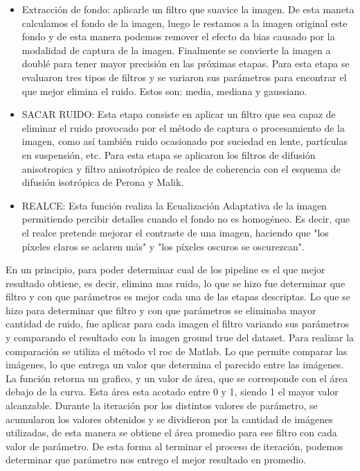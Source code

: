 \begin{itemize}
	\item Extracci\'on de fondo: aplicarle un filtro que suavice la imagen. De esta maneta calculamos el fondo de la imagen, luego le restamos a la imagen original este fondo y de esta manera podemos remover el efecto da bias causado por la modalidad de captura de la imagen. Finalmente se convierte la imagen a doublé para tener mayor precisión en las próximas etapas. 
Para esta etapa se evaluaron tres tipos de filtros y se variaron sus parámetros para encontrar el que mejor elimina el ruido. Estos son: media, mediana y gaussiano.
	\item SACAR  RUIDO:  Esta etapa consiste en aplicar un filtro que sea capaz de eliminar el ruido provocado por el método de captura o procesamiento de la  imagen, como así también ruido ocasionado por suciedad en lente, partículas en suspensión, etc. 
Para esta etapa se aplicaron los filtros de difusión anisotropica y filtro anisotrópico de realce de coherencia con el esquema de difusión isotrópica de Perona y Malik.
	\item REALCE: Esta función realiza la Ecualización Adaptativa de la imagen permitiendo percibir detalles cuando el fondo no es homogéneo. Es decir, que el realce pretende mejorar el contraste de una imagen, haciendo que "los píxeles claros se aclaren más" y "los píxeles oscuros se oscurezcan". 
\end{itemize}

En un principio, para poder determinar cual de los pipeline es el que mejor resultado obtiene, es decir, elimina mas ruido, lo que se hizo fue determinar que filtro y con que parámetros es mejor cada una de las etapas descriptas.
Lo que se hizo para determinar que filtro y con que parámetros se eliminaba mayor cantidad de ruido, fue aplicar para cada imagen el filtro variando sus parámetros y comparando el resultado con la imagen ground true del dataset. Para realizar la comparación se utiliza el método vl roc de  Matlab. Lo que permite comparar las imágenes, lo que entrega un valor que determina el parecido entre las imágenes. La función retorna un grafico, y un valor de área, que se corresponde con el área debajo de la curva.  Esta área esta acotado entre 0 y 1, siendo 1 el mayor valor alcanzable.
Durante la iteración por los distintos valores de parámetro, se acumularon los valores obtenidos y se dividieron por la cantidad de imágenes utilizadas, de esta manera se obtiene el área promedio para ese filtro con cada valor de parámetro. De esta forma al terminar el proceso de iteración, podemos determinar que parámetro nos entrego el mejor resultado en promedio. 

